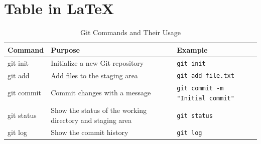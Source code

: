 \documentclass{article}
\begin{document}
\section{Table in LaTeX}
\begin{table}[h]
\centering
\begin{tabular}{|l|l|l|}
\hline
\textbf{Command}   & \textbf{Purpose}                                  & \textbf{Example}       \\ \hline
git init           & Initialize a new Git repository                  & \texttt{git init}      \\ \hline
git add            & Add files to the staging area                    & \texttt{git add file.txt} \\ \hline
git commit         & Commit changes with a message                    & \texttt{git commit -m "Initial commit"} \\ \hline
git status         & Show the status of the working directory and staging area & \texttt{git status}    \\ \hline
git log            & Show the commit history                          & \texttt{git log}       \\ \hline
\end{tabular}
\caption{Git Commands and Their Usage}
\label{tab:git-commands}
\end{table}
\end{document}
